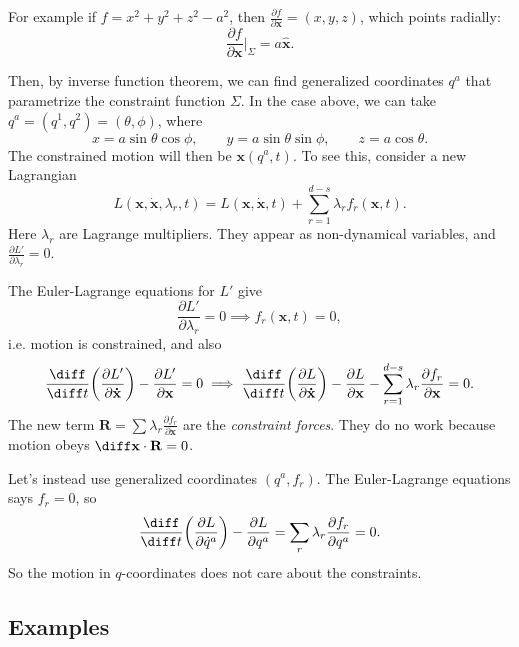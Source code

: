 \documentclass[12pt]{article}
\begin{document}
For example if $f = x^2 + y^2 + z^2 - a^2$, then $\frac{\partial f}{\partial \mathbf{x}} = (x, y, z)$, which points radially:
\[
\frac{\partial f}{\partial \mathbf{x}} \biggr|_{\Sigma} = a \mathbf{\hat x}.
\]

Then, by inverse function theorem, we can find generalized coordinates $q^a$ that parametrize the constraint function $\Sigma$. In the case above, we can take $q^a = (q^1, q^2) = (\theta, \phi)$, where
\[
x = a \sin \theta \cos \phi,\qquad y = a \sin \theta \sin \phi, \qquad z = a \cos \theta.
\]
The constrained motion will then be $\mathbf{x}(q^a, t)$. To see this, consider a new Lagrangian
\[
L(\mathbf{x}, \mathbf{\dot x}, \lambda_r, t) = L(\mathbf{x}, \mathbf{\dot x}, t) + \sum_{r = 1}^{d-s} \lambda_r f_r(\mathbf{x}, t).
\]
Here $\lambda_r$ are Lagrange multipliers. They appear as non-dynamical variables, and $\frac{\partial L'}{\partial \lambda_r} = 0$.

The Euler-Lagrange equations for $L'$ give
\[
\frac{\partial L'}{\partial \lambda_r} = 0 \implies f_r(\mathbf{x}, t) = 0,
\]
i.e. motion is constrained, and also
\[
\frac{\diff}{\diff t} \biggl( \frac{\partial L'}{\partial \mathbf{\dot x}} \biggr) - \frac{\partial L'}{\partial \mathbf{x}} = 0 \implies \frac{\diff}{\diff t} \biggl( \frac{\partial L}{\partial \mathbf{\dot x}} \biggr) - \frac{\partial L}{\partial \mathbf{x}} - \sum_{r = 1}^{d-s} \lambda_r \frac{\partial f_r}{\partial \mathbf{x}} = 0.
\]
The new term $\mathbf{R} = \sum \lambda_r \frac{\partial f_r}{\partial \mathbf{x}}$ are the \emph{constraint forces}. They do no work because motion obeys $\diff \mathbf{x} \cdot \mathbf{R} = 0$.

Let's instead use generalized coordinates $(q^a, f_r)$. The Euler-Lagrange equations says $f_r = 0$, so
\[
\frac{\diff}{\diff t} \biggl( \frac{\partial L}{\partial \dot q^a} \biggr) - \frac{\partial L}{\partial q^a} = \sum_r \lambda_r \frac{\partial f_r}{\partial q^a} = 0.
\]
So the motion in $q$-coordinates does not care about the constraints.

\subsection{Examples}
\label{sub:lagrange_ex}
\end{document}
